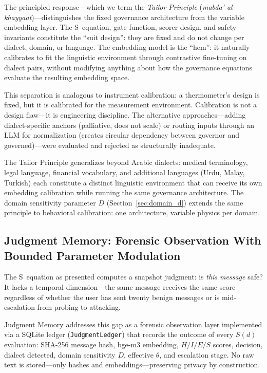 \documentclass[11pt,a4paper]{article}
\begin{document}
The principled response---which we term the \emph{Tailor Principle} (\emph{mabda' al-khayyaat})---distinguishes the fixed governance architecture from the variable embedding layer. The S~equation, gate function, scorer design, and safety invariants constitute the ``suit design'': they are fixed and do not change per dialect, domain, or language. The embedding model is the ``hem'': it naturally calibrates to fit the linguistic environment through contrastive fine-tuning on dialect pairs, without modifying anything about how the governance equations evaluate the resulting embedding space.

This separation is analogous to instrument calibration: a thermometer's design is fixed, but it is calibrated for the measurement environment. Calibration is not a design flaw---it is engineering discipline. The alternative approaches---adding dialect-specific anchors (palliative, does not scale) or routing inputs through an LLM for normalization (creates circular dependency between governor and governed)---were evaluated and rejected as structurally inadequate.

The Tailor Principle generalizes beyond Arabic dialects: medical terminology, legal language, financial vocabulary, and additional languages (Urdu, Malay, Turkish) each constitute a distinct linguistic environment that can receive its own embedding calibration while running the same governance architecture. The domain sensitivity parameter $D$ (Section~\ref{sec:domain_d}) extends the same principle to behavioral calibration: one architecture, variable physics per domain.


\subsection{Judgment Memory: Forensic Observation With Bounded Parameter Modulation}
\label{sec:judgment_memory}

The S~equation as presented computes a snapshot judgment: is \emph{this message} safe? It lacks a temporal dimension---the same message receives the same score regardless of whether the user has sent twenty benign messages or is mid-escalation from probing to attacking.

Judgment Memory addresses this gap as a forensic observation layer implemented via a SQLite ledger (\texttt{JudgmentLedger}) that records the outcome of every $S(d)$ evaluation: SHA-256 message hash, bge-m3 embedding, $H/I/E/S$ scores, decision, dialect detected, domain sensitivity $D$, effective $\theta$, and escalation stage. No raw text is stored---only hashes and embeddings---preserving privacy by construction.
\end{document}
